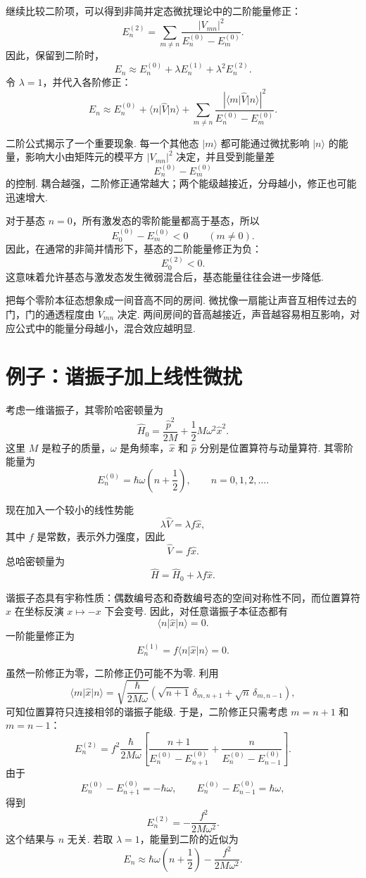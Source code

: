 \documentclass[UTF8,11pt,a4paper,openany]{ctexbook}
\newcommand{\ket}[1]{\lvert #1\rangle}\newcommand{\bra}[1]{\langle #1\rvert}
\begin{document}
继续比较二阶项，可以得到非简并定态微扰理论中的二阶能量修正：
\[
E_n^{(2)}
=
\sum_{m\ne n}
\frac{\left|V_{mn}\right|^2}
{E_n^{(0)}-E_m^{(0)}}.
\]
因此，保留到二阶时，
\[
E_n\approx
E_n^{(0)}
+\lambda E_n^{(1)}
+\lambda^2E_n^{(2)}.
\]
令 $\lambda=1$，并代入各阶修正：
\[
E_n\approx
E_n^{(0)}
+\bra n\hat V\ket n
+\sum_{m\ne n}
\frac{\left|\bra m\hat V\ket n\right|^2}
{E_n^{(0)}-E_m^{(0)}}.
\]

二阶公式揭示了一个重要现象. 每一个其他态 $\ket m$ 都可能通过微扰影响 $\ket n$ 的能量，影响大小由矩阵元的模平方 $\left|V_{mn}\right|^2$ 决定，并且受到能量差
\[
E_n^{(0)}-E_m^{(0)}
\]
的控制. 耦合越强，二阶修正通常越大；两个能级越接近，分母越小，修正也可能迅速增大. 

对于基态 $n=0$，所有激发态的零阶能量都高于基态，所以
\[
E_0^{(0)}-E_m^{(0)}<0
\qquad (m\ne0).
\]
因此，在通常的非简并情形下，基态的二阶能量修正为负：
\[
E_0^{(2)}<0.
\]
这意味着允许基态与激发态发生微弱混合后，基态能量往往会进一步降低. 

\begin{analogybox}
把每个零阶本征态想象成一间音高不同的房间. 微扰像一扇能让声音互相传过去的门，门的通透程度由 $V_{mn}$ 决定. 两间房间的音高越接近，声音越容易相互影响，对应公式中的能量分母越小，混合效应越明显. 
\end{analogybox}

\section{例子：谐振子加上线性微扰}

考虑一维谐振子，其零阶哈密顿量为
\[
\hat H_0
=
\frac{\hat p^2}{2M}
+\frac12M\omega^2\hat x^2.
\]
这里 $M$ 是粒子的质量，$\omega$ 是角频率，$\hat x$ 和 $\hat p$ 分别是位置算符与动量算符. 其零阶能量为
\[
E_n^{(0)}=\hbar\omega\left(n+\frac12\right),
\qquad n=0,1,2,\ldots.
\]

现在加入一个较小的线性势能
\[
\lambda\hat V=\lambda f\hat x,
\]
其中 $f$ 是常数，表示外力强度，因此
\[
\hat V=f\hat x.
\]
总哈密顿量为
\[
\hat H
=
\hat H_0+\lambda f\hat x.
\]

谐振子态具有宇称性质：偶数编号态和奇数编号态的空间对称性不同，而位置算符 $\hat x$ 在坐标反演 $x\mapsto -x$ 下会变号. 因此，对任意谐振子本征态都有
\[
\bra n\hat x\ket n=0.
\]
一阶能量修正为
\[
E_n^{(1)}
=
f\bra n\hat x\ket n=0.
\]

虽然一阶修正为零，二阶修正仍可能不为零. 利用
\[
\bra m\hat x\ket n
=
\sqrt{\frac{\hbar}{2M\omega}}
\left(
\sqrt{n+1}\,\delta_{m,n+1}
+\sqrt n\,\delta_{m,n-1}
\right),
\]
可知位置算符只连接相邻的谐振子能级. 于是，二阶修正只需考虑 $m=n+1$ 和 $m=n-1$：
\[
E_n^{(2)}
=
f^2\frac{\hbar}{2M\omega}
\left[
\frac{n+1}{E_n^{(0)}-E_{n+1}^{(0)}}
+
\frac{n}{E_n^{(0)}-E_{n-1}^{(0)}}
\right].
\]
由于
\[
E_n^{(0)}-E_{n+1}^{(0)}=-\hbar\omega,
\qquad
E_n^{(0)}-E_{n-1}^{(0)}=\hbar\omega,
\]
得到
\[
E_n^{(2)}
=
-\frac{f^2}{2M\omega^2}.
\]
这个结果与 $n$ 无关. 若取 $\lambda=1$，能量到二阶的近似为
\[
E_n
\approx
\hbar\omega\left(n+\frac12\right)
-\frac{f^2}{2M\omega^2}.
\]
\end{document}
